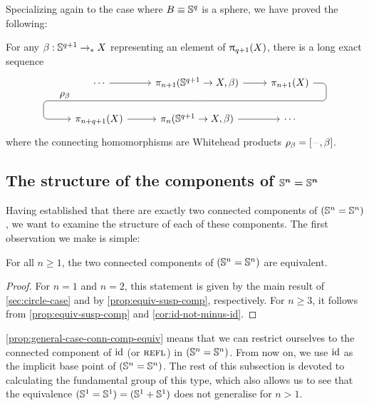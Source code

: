 \documentclass[english,a4paper]{lmcs}
\begin{document}
Specializing again to the case where $B \equiv {\mathbb S^{q}}$ is a sphere,
we have proved the following:
\begin{thm}\label{thm:sort-of-ehp}
  For any $\beta : {\mathbb S^{q+1}} \to_\ast X$ representing an element of $\uppi_{q+1}(X)$,
  there is a long exact sequence
  \[
    \begin{tikzcd}
      \cdots \ar[r]\ar[d,phantom, "\rho_\beta"{xshift=-8ex,yshift=1ex}] &
      \pi_{n+1}(\Sn{q+1} \to X, \beta)
      \ar[r] \ar[d, phantom, ""{coordinate, name=Z}] &
      \pi_{n+1}(X) \ar[dll, rounded corners,
      to path={ -- ([xshift=8.5ex]\tikztostart.center)
        |- (Z) [near end]\tikztonodes
        -| ([xshift=-13ex]\tikztotarget.center) -- (\tikztotarget)}] \\
      \pi_{n+q+1}(X) \ar[r] &
      \pi_n(\Sn{q+1} \to X,\beta) \ar[r] &
      \cdots
    \end{tikzcd}
  \]
  where the connecting homomorphisms are Whitehead products
  $\rho_\beta = [\blank,\beta]$.
\end{thm}

\subsection{The structure of the components of \texorpdfstring{$\boldsymbol{{\mathbb S^{n}} = {\mathbb S^{n}}}$}{Sn = Sn}}

Having established that there are exactly two connected components of $({\mathbb S^{n}} = {\mathbb S^{n}})$, we want to examine the structure of each of these components.
The first observation we make is simple:

\begin{prop} \label{prop:general-case-conn-comp-equiv}
    For all $n \geq 1$, the two connected components of $({\mathbb S^{n}} = {\mathbb S^{n}})$ are equivalent.
\end{prop}
\begin{proof}
    For $n=1$ and $n=2$, this statement is given by the main result of \cref{sec:circle-case} and by \cref{prop:equiv-susp-comp}, respectively.
	For $n \geq 3$, it follows from \cref{prop:equiv-susp-comp} and \cref{cor:id-not-minus-id}.
\end{proof}

\cref{prop:general-case-conn-comp-equiv} means that we can restrict ourselves to the connected component of $\mathord{\mathrm{id}}$ (or $\mathop{{\textsc{refl}}_{}}$) in $({\mathbb S^{n}} = {\mathbb S^{n}})$. From now on, we use $\mathord{\mathrm{id}}$ as the implicit base point of $({\mathbb S^{n}} = {\mathbb S^{n}})$.
The rest of this subsection is devoted to calculating the fundamental group of this type, which also allows us to see that the equivalence $({\mathbb S^{1}} = {\mathbb S^{1}}) = ({\mathbb S^{1}} + {\mathbb S^{1}})$ does not generalise for $n > 1$.
\end{document}
